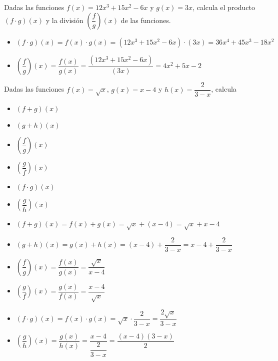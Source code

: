 \begin{ex}
	Dadas las funciones $f(x)=12x^3+15x^2-6x$ y $g(x)=3x$, calcula el producto $(f \cdot g)(x)$ y la división $(\dfrac{f}{g})(x)$ de las funciones.
	\begin{sol}
		\begin{itemize}
			\item $(f \cdot g)(x) = f(x) \cdot g(x) = (12x^3+15x^2-6x) \cdot(3x) = 36x^4+45x^3-18x^2$
			\item $(\dfrac{f}{g})(x) = \dfrac{f(x)}{g(x)} = \dfrac{(12x^3+15x^2-6x)}{(3x)} = 4x^2+5x-2$
		\end{itemize}
	\end{sol}
\end{ex}

\vspace{1cm}

\begin{ex}
	Dadas las funciones $f(x)=\sqrt{x}$, $g(x)=x-4$ y $h(x)=\dfrac{2}{3-x}$, calcula
	\begin{itemize}
		\item $(f+g)(x)$
		\item $(g+h)(x)$
		\item $(\dfrac{f}{g})(x)$
		\item $(\dfrac{g}{f})(x)$
		\item $(f\cdot g)(x)$
		\item $(\dfrac{g}{h})(x)$
	\end{itemize} 
	\begin{sol}
		\begin{itemize}
			\item $(f+g)(x) = f(x) + g(x) = \sqrt{x} + (x-4) = \sqrt{x} + x -4$
			\item $(g+h)(x) = g(x) + h(x) = (x-4) + \dfrac{2}{3-x} = x - 4 + \dfrac{2}{3-x}$
			\item $(\dfrac{f}{g})(x) = \dfrac{f(x)}{g(x)} = \dfrac{\sqrt{x}}{x-4}$
			\item $(\dfrac{g}{f})(x) = \dfrac{g(x)}{f(x)} = \dfrac{x-4}{\sqrt{x}}$
			\item $(f\cdot g)(x) = f(x) \cdot g(x) = \sqrt{x} \cdot \dfrac{2}{3-x} = \dfrac{2\sqrt{x}}{3-x}$
			\item $(\dfrac{g}{h})(x) = \dfrac{g(x)}{h(x)} = \dfrac{x-4}{\dfrac{2}{3-x}} = \dfrac{(x-4)(3-x)}{2}$
		\end{itemize}
	\end{sol}
\end{ex}

